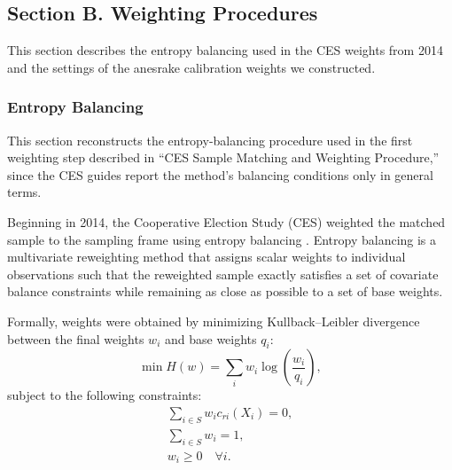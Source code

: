 \documentclass[12pt]{article}
\begin{document}
\clearpage


\subsection*{Section B. Weighting Procedures}
{}
\label{app:entropy_balancing}

This section describes the entropy balancing used in the CES weights from 2014 and the settings of the anesrake calibration weights we constructed.

\subsubsection*{Entropy Balancing}

This section reconstructs the entropy-balancing procedure used in the first weighting step described in ``CES Sample Matching and Weighting Procedure,'' since the CES guides report the method's balancing conditions only in general terms.

Beginning in 2014, the Cooperative Election Study (CES) weighted the matched sample to the sampling frame using entropy balancing \parencite{hainmueller_entropy_2012}. Entropy balancing is a multivariate reweighting method that assigns scalar weights to individual observations such that the reweighted sample exactly satisfies a set of covariate balance constraints while remaining as close as possible to a set of base weights.

Formally, weights were obtained by minimizing Kullback--Leibler divergence \parencite{kullback_information_1959} between the final weights \( w_i \) and base weights \( q_i \):
\[
\min H(w) = \sum_{i} w_{i} \log\!\left(\frac{w_{i}}{q_{i}}\right),
\]
subject to the following constraints:
\begin{gather}
    \sum_{i \in S} w_{i} c_{ri}(X_i) = 0, \label{eq:ebalance1} \\
    \sum_{i \in S} w_{i} = 1, \label{eq:ebalance2} \\
    w_{i} \ge 0 \quad \forall i. \label{eq:ebalance3}
\end{gather}
\end{document}
